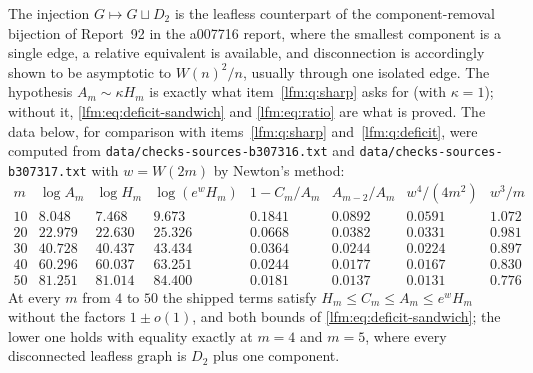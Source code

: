 \documentclass[11pt,letterpaper]{article}
\theoremstyle{remark}\newtheorem{remark}[theorem]{Remark}
\begin{document}
The injection $G\mapsto G\sqcup D_2$ is the leafless counterpart of the
component-removal bijection of Report~92 in the a007716 report, where the
smallest component is a single edge, a relative equivalent is available, and
disconnection is accordingly shown to be asymptotic to $W(n)^2/n$, usually
through one isolated edge. The hypothesis $A_m\sim\kappa H_m$ is exactly what
item~\ref{lfm:q:sharp} asks for (with $\kappa=1$); without it, \eqref{lfm:eq:deficit-sandwich} and
\eqref{lfm:eq:ratio} are what is proved. The data below, for comparison
with items~\ref{lfm:q:sharp} and~\ref{lfm:q:deficit}, were computed from
\nolinkurl{data/checks-sources-b307316.txt} and
\nolinkurl{data/checks-sources-b307317.txt} with $w=W(2m)$ by Newton's
method:
\[
\begin{array}{r|rrr|rrrr}
 m&\log A_m&\log H_m&\log(e^wH_m)&1-C_m/A_m&A_{m-2}/A_m&w^4/(4m^2)&w^3/m\\\hline
 10&8.048&7.468&9.673&0.1841&0.0892&0.0591&1.072\\
 20&22.979&22.630&25.326&0.0668&0.0382&0.0331&0.981\\
 30&40.728&40.437&43.434&0.0364&0.0244&0.0224&0.897\\
 40&60.296&60.037&63.251&0.0244&0.0177&0.0167&0.830\\
 50&81.251&81.014&84.400&0.0181&0.0137&0.0131&0.776
\end{array}
\]
At every $m$ from $4$ to $50$ the shipped terms satisfy
$H_m\le C_m\le A_m\le e^wH_m$ without the factors $1\pm o(1)$, and both
bounds of \eqref{lfm:eq:deficit-sandwich}; the lower one holds with equality
exactly at $m=4$ and $m=5$, where every disconnected leafless graph is $D_2$
plus one component.
\end{document}
